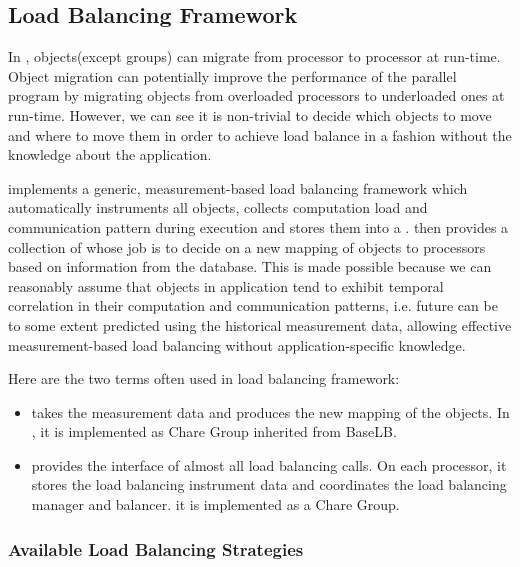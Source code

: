 \subsection{Load Balancing Framework}
\label{lbFramework}

In \charmpp{}, objects(except groups) can migrate from processor to 
processor at run-time. Object migration can potentially improve the 
performance of the parallel program by migrating objects from overloaded 
processors to underloaded ones at run-time. However, we can see it is 
non-trivial to decide which objects to move and where to move them in 
order to achieve load balance in a fashion without the knowledge about the 
application. 

 \charmpp{} implements a generic, measurement-based load balancing framework 
which automatically instruments all \charmpp{} objects, collects computation 
load and communication pattern during execution and stores them into a 
. \charmpp{} then provides a collection of 
 whose job is to decide on a new mapping of 
objects to processors based on information from the database.
This is made possible because we can reasonably assume that objects
in \charmpp{} application tend to exhibit temporal correlation in
their computation and communication patterns, i.e. future can be to some
extent predicted using the historical measurement data, allowing effective
measurement-based load balancing without application-specific knowledge.

Here are the two terms often used in \charmpp{} load balancing framework:
\begin{itemize}
\item {} takes the measurement
   data and produces the new mapping of the objects. In \charmpp{}, it is
   implemented as Chare Group inherited from BaseLB.
\item {} provides the interface of almost all
   load balancing calls. On each processor, it stores the load
   balancing instrument data and coordinates the load balancing manager and
   balancer. it is implemented as a Chare Group.
\end{itemize}

\subsubsection{Available Load Balancing Strategies}
\label{lbStrategy}

